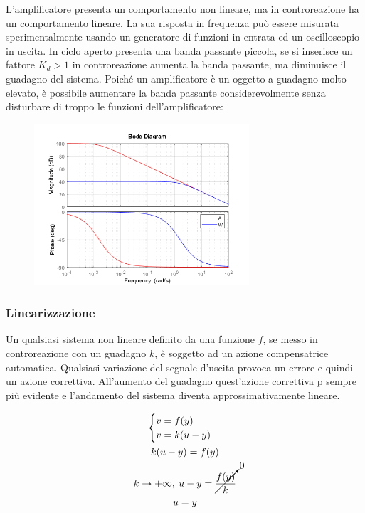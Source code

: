 \documentclass{article}
\numberwithin{equation}{subsection}
\begin{document}
L'amplificatore presenta un comportamento non lineare, ma in controreazione ha un comportamento lineare. La sua risposta in frequenza può essere misurata 
sperimentalmente usando un generatore di funzioni in entrata ed un oscilloscopio in uscita. In ciclo aperto presenta una banda passante piccola, se si inserisce un 
fattore $K_d>1$ in controreazione aumenta la banda passante, ma diminuisce il guadagno del sistema. Poiché un amplificatore è un oggetto a guadagno 
molto elevato, è possibile aumentare la banda passante considerevolmente senza disturbare di troppo le funzioni dell'amplificatore:
\begin{figure}[H]%
    \centering
    \includegraphics[width=8cm]{Amplificatore.png}%
\end{figure}

\subsubsection{Linearizzazione}

Un qualsiasi sistema non lineare definito da una funzione $f$, se messo in controreazione con un guadagno $k$, è soggetto ad un azione compensatrice automatica. 
Qualsiasi variazione del segnale d'uscita provoca un errore e quindi un azione correttiva. All'aumento del guadagno quest'azione correttiva p sempre più 
evidente e l'andamento del sistema diventa approssimativamente lineare. 

\begin{gather*}
    \begin{cases}
        v=f(y)\\
        v=k(u-y)
    \end{cases}\\
    k(u-y)=f(y)\\
    k\to+\infty,\:u-y=\cancelto{0}{\displaystyle\frac{f(y)}{k}}\\
    u=y
\end{gather*}
\end{document}
